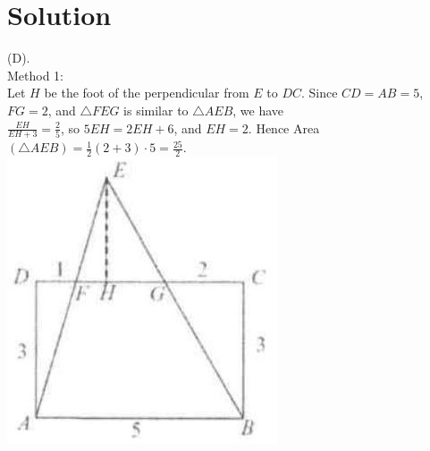 \documentclass{article}
\begin{document}
\section*{Solution}
(D).\\
Method 1:\\
Let \(H\) be the foot of the perpendicular from \(E\) to \(D C\). Since \(C D=A B=5\), \(F G=2\), and \(\triangle F E G\) is similar to \(\triangle A E B\), we have\\
\(\frac{E H}{E H+3}=\frac{2}{5}\), so \(5 E H=2 E H+6\), and \(E H=2\). Hence Area \((\triangle A E B)=\frac{1}{2}(2+3) \cdot 5=\frac{25}{2}\).\\
\centering
\includegraphics[width=\textwidth]{images/093.jpg}
\end{document}
